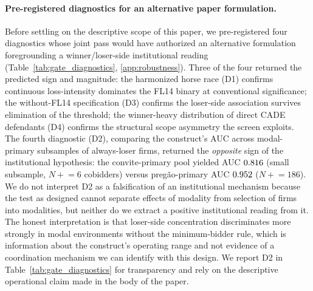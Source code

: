 \paragraph{Pre-registered diagnostics for an alternative paper formulation.}
Before settling on the descriptive scope of this paper, we
pre-registered four diagnostics whose joint pass would have
authorized an alternative formulation foregrounding a
winner/loser-side institutional reading
(Table~\ref{tab:gate_diagnostics}, \ref{app:robustness}). Three
of the four returned the predicted sign and magnitude:
the harmonized horse race (D1) confirms continuous
loss-intensity dominates the FL14 binary at conventional
significance; the without-FL14 specification (D3) confirms the
loser-side association survives elimination of the threshold;
the winner-heavy distribution of direct CADE defendants (D4)
confirms the structural scope asymmetry the screen exploits.
The fourth diagnostic (D2), comparing the construct's AUC
across modal-primary subsamples of always-loser firms,
returned the \emph{opposite} sign of the institutional
hypothesis: the convite-primary pool yielded AUC $0.816$
(small subsample, $N\!\!+\!\!=\!\!6$ cobidders) versus
preg\~ao-primary AUC $0.952$ ($N\!\!+\!\!=\!\!186$). We do not
interpret D2 as a falsification of an institutional mechanism
because the test as designed cannot separate effects of
modality from selection of firms into modalities, but neither
do we extract a positive institutional reading from it. The
honest interpretation is that loser-side concentration
discriminates more strongly in modal environments without the
minimum-bidder rule, which is information about the
construct's operating range and not evidence of a coordination
mechanism we can identify with this design. We report D2 in
Table~\ref{tab:gate_diagnostics} for transparency and rely on
the descriptive operational claim made in the body of the
paper.

